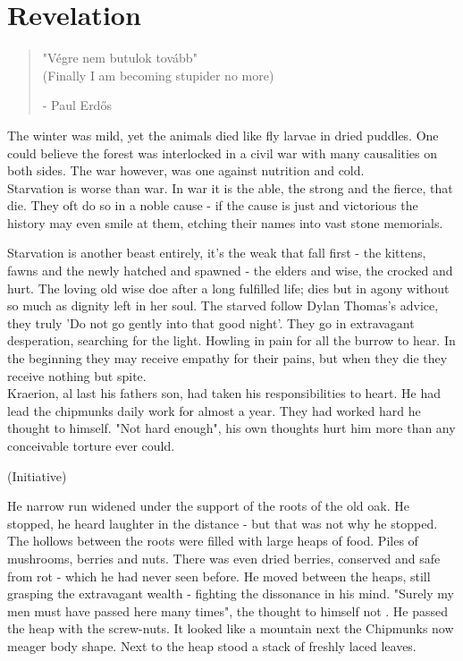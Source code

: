 \documentclass[smalldemyvopaper,11pt,twoside,onecolumn,openright,extrafontsizes]{memoir}
\begin{document}
\chapter{Revelation}

\vspace{-1.3cm}
\begin{localsize}{10}
	\begin{quote}
		"Végre nem butulok tovább"\\
		
		(Finally I am becoming stupider no more) 
		\begin{flushright}- Paul Erdős \end{flushright}
	\end{quote} 
\end{localsize}
\vspace{1cm}


The winter was mild, yet the animals died like fly larvae in dried puddles. One could believe the forest was interlocked in a civil war with many causalities on both sides. The war however, was one against nutrition and cold. \\

Starvation is worse than war. In war it is the able, the strong and the fierce, that die. They oft do so in a noble cause - if the cause is just and victorious the history may even smile at them, etching their names into vast stone memorials. 

Starvation is another beast entirely, it's the weak that fall first - the kittens, fawns and the newly hatched and spawned - the elders and wise, the crocked and hurt. The loving old wise doe after a long fulfilled life; dies but in agony without so much as dignity left in her soul. The starved follow Dylan Thomas's advice, they truly 'Do not go gently into that good night'. They go in extravagant desperation, searching for the light. Howling in pain for all the burrow to hear. In the beginning they may receive empathy for their pains, but when they die they receive nothing but spite.\\

Kraerion, al last his fathers son, had taken his responsibilities to heart. He had lead the chipmunks daily work for almost a year. They had worked hard he thought to himself. "Not hard enough", his own thoughts hurt him more than any conceivable torture ever could. 

(Initiative)


He narrow run widened under the support of the roots of the old oak. He stopped, he heard laughter in the distance - but that was not why he stopped. The hollows between the roots were filled with large heaps of food. Piles of mushrooms, berries and nuts. There was even dried berries, conserved and safe from rot - which he had never seen before. He moved between the heaps, still grasping the extravagant wealth - fighting the dissonance in his mind. "Surely my men must have passed here many times", the thought to himself not . He passed the heap with the screw-nuts. It looked like a mountain next the Chipmunks now meager body shape. Next to the heap stood a stack of freshly laced leaves. 
\end{document}
